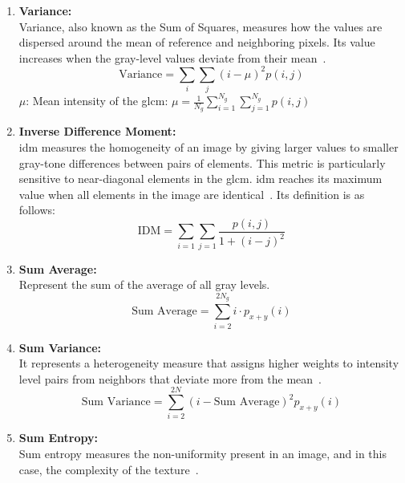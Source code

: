 \begin{enumerate}
    \item \textbf{Variance:}\\
    Variance, also known as the Sum of Squares, measures how the values are dispersed around the mean of reference and neighboring pixels. 
    Its value increases when the gray-level values deviate from their mean~\cite{oprisan_bounds_2023}.
        \begin{equation}
            \text{Variance} = \sum_{i} \sum_{j} (i - \mu)^2 p(i,j)
        \end{equation}
      $\mu$: Mean intensity of the \ac{glcm}: $\mu = \frac{1}{N_g}\sum_{i=1}^{N_g} \sum_{j=1}^{N_g} p(i,j)$ \\
    
    \item \textbf{Inverse Difference Moment:}\\
    \acf{idm} measures the homogeneity of an image by giving larger values to smaller gray-tone differences between pairs of elements. This metric is particularly sensitive to near-diagonal elements in the \ac{glcm}. \ac{idm} reaches its maximum value when all elements in the image are identical~\cite{oprisan_bounds_2023}.
    Its definition is as follows:
        \begin{equation}
            \text{IDM} = \sum_{i=1} \sum_{j=1} \frac{p(i,j)}{1 + (i - j)^2}
        \end{equation}
        
    \item \textbf{Sum Average:}\\
    Represent the sum of the average of all gray levels.
        \begin{equation}
            \text{Sum Average} = \sum_{i=2}^{2N_g} i \cdot p_{x+y}(i)
        \end{equation}
        
    \item \textbf{Sum Variance:}\\
    It represents a heterogeneity measure that assigns higher weights to intensity level pairs from neighbors that deviate more from the mean~\cite{oprisan_bounds_2023}.
        \begin{equation}
            \text{Sum Variance} = \sum_{i=2}^{2N} (i - \text{Sum Average})^2 p_{x+y}(i)
        \end{equation}  
        
    \item \textbf{Sum Entropy:}\\
    Sum entropy measures the non-uniformity present in an image, and in this case, the complexity of the texture~\cite{oprisan_bounds_2023}.
    

\end{enumerate}
